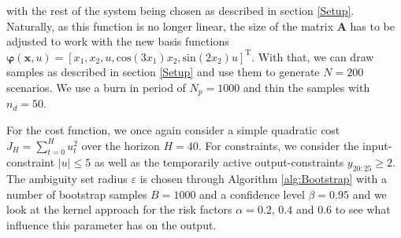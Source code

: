 with the rest of the system being chosen as described in section \ref{Setup}. Naturally, as this function is no longer linear, the size of the matrix $\boldsymbol{A}$ has to be adjusted to work with the new basis functions $\boldsymbol{\varphi} (\boldsymbol{x}, u) = \left[ x_1,  x_2,  u, \text{cos} ( 3 x_1) x_2, \text{sin} (2 x_2) u \right]^\text{T}$. With that, we can draw samples as described in section \ref{Setup} and use them to generate $N = 200$ scenarios. We use a burn in period of $N_p = 1000$ and thin the samples with $n_d = 50$.

For the cost function, we once again consider a simple quadratic cost $J_H = \sum_{t = 0}^H u_t^2$ over the horizon $H = 40$. For constraints, we consider the input-constraint $\left| u \right| \leq 5$ as well as the temporarily active output-constraints $y_{20:25} \geq 2$. The ambiguity set radius $\varepsilon$ is chosen through Algorithm \ref{alg:Bootstrap} with a number of bootstrap samples $B = 1000$ and a confidence level $\beta = 0.95$ and we look at the kernel approach for the risk factors $\alpha = 0.2$, $0.4$ and $0.6$ to see what influence this parameter has on the output.

